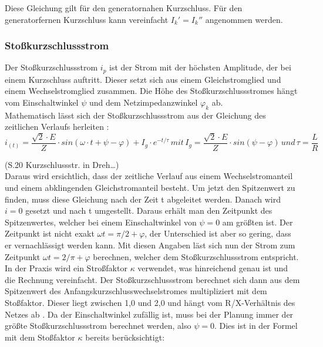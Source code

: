 \documentclass{scrartcl}
\begin{document}
\begin{onehalfspace}
Diese Gleichung gilt für den generatornahen Kurzschluss. Für den generatorfernen Kurzschluss kann vereinfacht $I_k' = I_k''$ angenommen werden.

\subsubsection{Stoßkurzschlussstrom}
Der Stoßkurzschlussstrom $i_p$ ist der Strom mit der höchsten Amplitude, der bei einem Kurzschluss auftritt. Dieser setzt sich aus einem Gleichstromglied und einem Wechselstromglied zusammen. Die Höhe des Stoßkurzschlussstromes hängt vom Einschaltwinkel $\psi$ und dem Netzimpedanzwinkel $\varphi_k$ ab. \\
Mathematisch lässt sich der Stoßkurzschlussstrom aus der Gleichung des zeitlichen Verlaufs herleiten \cite[S. 20]{Roeper1964}: \\

\begin{equation}
i_{(t)} = \frac{\sqrt{2} \cdot E}{Z} \cdot sin(\omega \cdot t + \psi - \varphi) + I_g \cdot e^{-t/\tau} 
\hspace{2pt} mit \hspace{2pt} I_g = \frac{\sqrt{2} \cdot E}{Z} \cdot sin( \psi -  \varphi) \hspace{2pt} und \hspace{2pt} \tau = \frac{L}{R}
\end{equation}

(S.20 Kurzschlussstr. in Dreh…)\\
Daraus wird ersichtlich, dass der zeitliche Verlauf aus einem Wechselstromanteil und einem abklingenden Gleichstromanteil besteht. Um jetzt den Spitzenwert zu finden, muss diese Gleichung nach der Zeit t abgeleitet werden. Danach wird $i = 0$ gesetzt und nach t umgestellt. Daraus erhält man den Zeitpunkt des Spitzenwertes, welcher bei einem Einschaltwinkel von $\psi = 0$ am größten ist. Der Zeitpunkt ist nicht exakt $\omega t = \pi/2 + \varphi$, der Unterschied ist aber so gering, dass er vernachlässigt werden kann. Mit diesen Angaben läst sich nun der Strom zum Zeitpunkt $\omega t = 2/\pi + \varphi$ berechnen, welcher dem Stoßkurzschlussstrom entspricht.\\
In der Praxis wird ein Stroßfaktor $\kappa$ verwendet, was hinreichend genau ist und die Rechnung vereinfacht.
Der Stoßkurzschlussstrom berechnet sich dann aus dem Spitzenwert des Anfangskurzschlusswechselstromes multipliziert mit dem Stoßfaktor. Dieser liegt zwischen 1,0 und 2,0 und hängt vom R/X-Verhältnis des Netzes ab \cite[S. 246]{Funk1962}.
Da der Einschaltwinkel zufällig ist, muss bei der Planung immer der größte Stoßkurzschlussstrom berechnet werden, also $\psi = 0$. Dies ist in der Formel mit dem Stoßfaktor $\kappa$ bereits berücksichtigt: \\


\end{onehalfspace}
\end{document}
